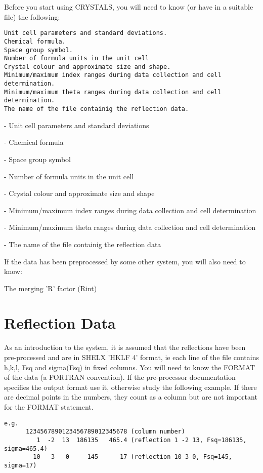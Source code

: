 \documentclass[10pt,a4paper]{report}
\begin{document}
Before you start using CRYSTALS, you will need to know (or have in a
suitable file) the following:



\small\begin{verbatim}
Unit cell parameters and standard deviations.
Chemical formula.
Space group symbol.
Number of formula units in the unit cell
Crystal colour and approximate size and shape.
Minimum/maximum index ranges during data collection and cell determination.
Minimum/maximum theta ranges during data collection and cell determination.
The name of the file containig the reflection data.
\end{verbatim}\normalsize


- Unit cell parameters and standard deviations


- Chemical formula


- Space group symbol


- Number of formula units in the unit cell


- Crystal colour and approximate size and shape


- Minimum/maximum index ranges during data collection and cell determination


- Minimum/maximum theta ranges during data collection and cell determination


- The name of the file containig the reflection data





If the data has been preprocessed by some other system, you will also
need to know:


 
The merging 'R' factor (Rint)



\section{Reflection Data}


As an introduction to the system, it is assumed that the reflections
have been pre-processed and are in  SHELX  'HKLF 4' format, ie each line
of the file contains h,k,l, Fsq and sigma(Fsq) in fixed columns. You will need
to know the FORMAT of the data (a FORTRAN convention). If the pre-processor
documentation specifies the output format use it, otherwise study the
following example.
If there are decimal points in the numbers, they count as a column but
are not important for the FORMAT statement.


\small\begin{verbatim}
e.g.
      1234567890123456789012345678 (column number)
         1  -2  13  186135   465.4 (reflection 1 -2 13, Fsq=186135, sigma=465.4)
        10   3   0     145      17 (reflection 10 3 0, Fsq=145, sigma=17)

\end{verbatim}\normalsize
\end{document}
